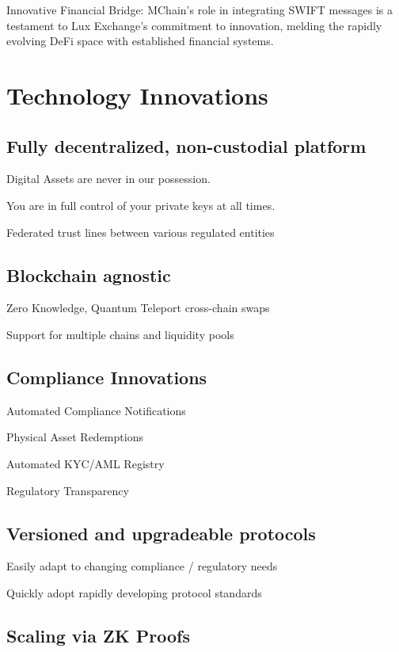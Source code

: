 \documentclass[11pt]{article}
\begin{document}
Innovative Financial Bridge: MChain's role in integrating SWIFT messages is a testament to Lux Exchange's commitment to innovation, melding the rapidly evolving DeFi space with established financial systems.


\section{Technology Innovations}

\subsection{Fully decentralized, non-custodial platform}

Digital Assets are never in our possession.


You are in full control of your private keys at all times.


Federated trust lines between various regulated entities


\subsection{Blockchain agnostic}

Zero Knowledge, Quantum Teleport cross-chain swaps


Support for multiple chains and liquidity pools


\subsection{Compliance Innovations}

Automated Compliance Notifications


Physical Asset Redemptions


Automated  KYC/AML Registry


Regulatory Transparency


\subsection{Versioned and upgradeable protocols}

Easily adapt to changing compliance / regulatory needs


Quickly adopt rapidly developing protocol standards


\subsection{Scaling via ZK Proofs}
\end{document}
